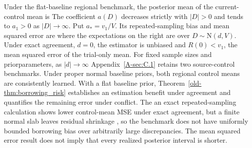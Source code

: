 \documentclass[11pt]{article}
\newcommand{\E}{\operatorname{E}}
\newcommand{\N}{\mathrm{N}}
\newtheorem{theorem}{Theorem}
\theoremstyle{remark}\newtheorem{remark}{Remark}[section]
\providecommand{\DIFaddtex}[1]{{\protect\color{blue} \sf #1}} %
\providecommand{\DIFdeltex}[1]{{\protect\color{red} \scriptsize #1}} %
\providecommand{\DIFaddbegin}{} %
\providecommand{\DIFaddend}{} %
\providecommand{\DIFdelbegin}{} %
\providecommand{\DIFdelend}{} %
\providecommand{\DIFadd}[1]{\texorpdfstring{\DIFaddtex{#1}}{#1}} %
\providecommand{\DIFdel}[1]{\texorpdfstring{\DIFdeltex{#1}}{}} %
\begin{document}
\DIFdelbegin %
\DIFdel{Under the flat-baseline regional benchmark, the posterior mean of the current-control mean is
}%
\DIFdel{The coefficient $a(D)$ decreases strictly with $|D|>0$ and tends to $a_1>0$ as $|D|\to\infty$. Put $a_*=v_1/V$. Its repeated-sampling bias and mean squared error are }%
\DIFdel{where the expectations on the right are over $D\sim\N(d,V)$. Under exact agreement, $d=0$, the estimator is unbiased and $R(0)<v_1$, the mean squared error of the trial-only mean. For fixed sample sizes and priorparameters, as $|d|\to\infty$}\DIFdelend \DIFaddbegin \DIFadd{Appendix~\ref{A-sec:C.1} retains two source-control benchmarks. Under proper normal baseline priors, both regional control means are consistently learned. With a flat baseline prior}\DIFaddend , \DIFdelbegin %
\DIFdel{Theorem~\ref{old-thm:borrowing_risk} establishes an estimation benefit under agreement and quantifies the remaining error under conflict. The }\DIFdelend \DIFaddbegin \DIFadd{an exact repeated-sampling calculation shows lower control-mean MSE under exact agreement, but a }\DIFaddend finite normal slab leaves residual shrinkage \DIFdelbegin \DIFdel{, so the benchmark does not have uniformly bounded borrowing bias over arbitrarily large discrepancies. The mean squared error result does not imply that every realized posterior interval is shorter.
}%
\end{document}
